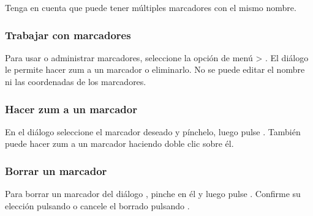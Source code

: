 Tenga en cuenta que puede tener múltiples marcadores con el mismo nombre.

\subsubsection{Trabajar con marcadores}
Para usar o administrar marcadores, seleccione la opción de menú  > .
El diálogo  le permite hacer zum a un marcador o eliminarlo.
No se puede editar el nombre ni las coordenadas de los marcadores.

\subsubsection{Hacer zum a un marcador}
En el diálogo  seleccione el marcador deseado y
pínchelo, luego pulse . También puede hacer zum a un marcador haciendo
doble clic sobre él.

\subsubsection{Borrar un marcador}
Para borrar un marcador del diálogo , pinche en él y luego pulse . Confirme su elección pulsando  o cancele el borrado pulsando .
